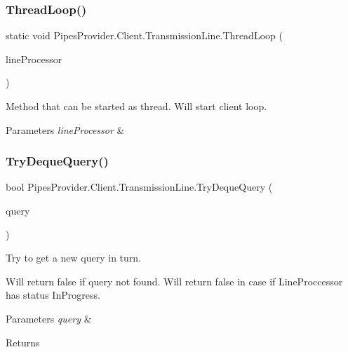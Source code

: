 \subsubsection{\texorpdfstring{Thread\+Loop()}{ThreadLoop()}}
{\footnotesize\ttfamily static void Pipes\+Provider.\+Client.\+Transmission\+Line.\+Thread\+Loop (\begin{DoxyParamCaption}\item[{object}]{line\+Processor }\end{DoxyParamCaption})\hspace{0.3cm}{\ttfamily [static]}}



Method that can be started as thread. Will start client loop. 


\begin{DoxyParams}{Parameters}
{\em line\+Processor} & \\
\hline
\end{DoxyParams}
\mbox{\label{class_pipes_provider_1_1_client_1_1_transmission_line_a48c6395608b4d32a7d852c2fd6d911e2}} 
\subsubsection{\texorpdfstring{Try\+Deque\+Query()}{TryDequeQuery()}}
{\footnotesize\ttfamily bool Pipes\+Provider.\+Client.\+Transmission\+Line.\+Try\+Deque\+Query (\begin{DoxyParamCaption}\item[{out \mbox{\hyperlink{struct_pipes_provider_1_1_client_1_1_query_container}{Query\+Container}}}]{query }\end{DoxyParamCaption})}



Try to get a new query in turn. 

Will return false if query not found. Will return false in case if Line\+Proccessor has status In\+Progress. 


\begin{DoxyParams}{Parameters}
{\em query} & \\
\hline
\end{DoxyParams}
\begin{DoxyReturn}{Returns}

\end{DoxyReturn}
\mbox{\label{class_pipes_provider_1_1_client_1_1_transmission_line_a75c4a1aa309fbc60cccbe258a85a91b3}} 
